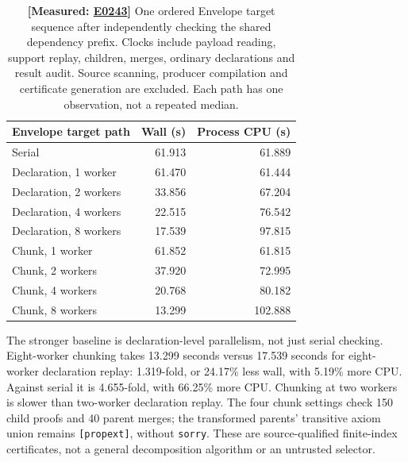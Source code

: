 \documentclass[10pt,twocolumn]{article}
\newcommand{\measured}[1]{\textbf{[Measured: #1]}}
\newcommand{\expref}[2]{\href{https://github.com/yunwei37/proofserve/blob/main/docs/tmp/build-and-evaluate/step-#1/step-report.md}{E#2}}
\begin{document}
\begin{table}[t]
\centering\small
\begin{tabular}{lrr}
\toprule
Envelope target path & Wall (s) & Process CPU (s)\\
\midrule
Serial &61.913&61.889\\
Declaration, 1 worker &61.470&61.444\\
Declaration, 2 workers &33.856&67.204\\
Declaration, 4 workers &22.515&76.542\\
Declaration, 8 workers &17.539&97.815\\
Chunk, 1 worker &61.852&61.815\\
Chunk, 2 workers &37.920&72.995\\
Chunk, 4 workers &20.768&80.182\\
Chunk, 8 workers &13.299&102.888\\
\bottomrule
\end{tabular}
\caption{\measured{\expref{0243-20261101T091434+0000}{0243}} One ordered Envelope target sequence after independently checking
the shared dependency prefix. Clocks include payload reading, support replay,
children, merges, ordinary declarations and result audit.
Source scanning, producer compilation and certificate generation are
excluded. Each path has one observation, not a repeated median.}
\label{tab:envelopepooled}
\end{table}

The stronger baseline is declaration-level parallelism, not just serial
checking. Eight-worker chunking takes 13.299 seconds versus 17.539 seconds
for eight-worker declaration replay: 1.319-fold, or 24.17\% less wall,
with 5.19\% more CPU.
Against serial it is 4.655-fold, with 66.25\% more CPU.
Chunking at two workers is slower than two-worker declaration replay.
The four chunk settings check 150 child proofs and 40 parent merges;
the transformed parents' transitive axiom union remains
\texttt{[propext]}, without \texttt{sorry}.
These are source-qualified finite-index certificates, not a general
decomposition algorithm or an untrusted selector.
\end{document}
